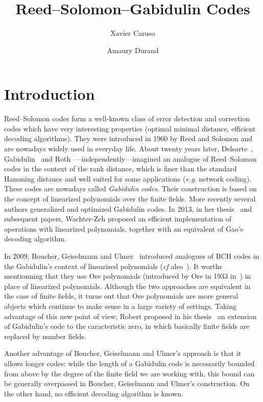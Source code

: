 \documentclass[a4paper]{llncs}
\title{Reed--Solomon--Gabidulin Codes}
\author{Xavier Caruso\inst{1} \and Amaury Durand\inst{2}}
\institute{%
CNRS, Institut Mathématique de Bordeaux, équipe-projet LFANT\
\email{xavier.caruso@normalesup.org}
\and
Université de Franche-Comté\
\email{amaury.durand@edu.univ-fcomte.fr}}
\begin{document}
\maketitle

\section*{Introduction}

Reed--Solomon codes form a well-known class of error detection and 
correction codes which have very interesting properties (optimal minimal 
distance, efficient decoding algorithms). They were introduced in 1960 
by Reed and Solomon and are nowadays widely used in everyday life. About 
twenty years later, Delsarte~\cite{delsarte}, Gabidulin~\cite{gabidulin} 
and Roth~\cite{roth}---independently---imagined an analogue of 
Reed--Solomon codes in the context of the rank distance, which is finer 
than the standard Hamming distance and well suited for some applications 
(\emph{e.g.} network coding). These codes are nowadays called 
\emph{Gabidulin codes}. Their construction is based on the concept of 
linearized polynomials over the finite fields. More recently several 
authors generalized and optimized Gabidulin codes. In 2013, in her 
thesis~\cite{wachter} and subsequent papers, Wachter-Zeh proposed an 
efficient implementation of operations with linearized polynomials, 
together with an equivalent of Gao's decoding algorithm.

In 2009, Boucher, Geiselmann and Ulmer~\cite{bougeiulm} introduced 
analogues of BCH codes in the Gabidulin's context of linearized 
polynomials (\emph{cf} also~\cite{bouulm}). 
It worths mentionning that they use Ore 
polynomials (introduced by Ore in 1933 in~\cite{ore}) in place of 
linearized polynomials. Although the two approaches are equivalent in 
the case of finite fields, it turns out that Ore polynomials are more 
general objects which continue to make sense in a large variety of 
settings.
Taking advantage of this new point of view, Robert proposed in his
thesis~\cite{robert} an extension of Gabidulin's code to the
caracteristic zero, in which basically finite fields are replaced 
by number fields.

Another advantage of Boucher, Geiselmann and Ulmer's approach is that it 
allows longer codes: while the length of a Gabidulin code is necessarily 
bounded from above by the degree of the finite field we are working 
with, this bound can be generally overpassed in Boucher, Geiselmann and 
Ulmer's construction. On the other hand, no efficient decoding algorithm 
is known.
\end{document}
